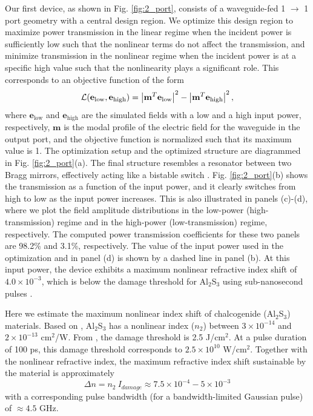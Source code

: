 Our first device, as shown in Fig. \ref{fig:2_port}, consists of a waveguide-fed 1 $\to$ 1 port geometry with a central design region.  We optimize this design region to maximize power transmission in the linear regime when the incident power is sufficiently low such that the nonlinear terms do not affect the transmission, and minimize transmission in the nonlinear regime when the incident power is at a specific high value such that the nonlinearity plays a significant role.  This corresponds to an objective function of the form
%
\begin{equation}
    \mathcal{L}(\mathbf{e}_{\textrm{low}}, \mathbf{e}_{\textrm{high}}) = \left|\mathbf{m}^T \mathbf{e}_{\textrm{low}}\right|^2 - \left|\mathbf{m}^T \mathbf{e}_{\textrm{high}}\right|^2,
\end{equation}
%
where $\mathbf{e}_{\mathrm{low}}$ and $\mathbf{e}_{\mathrm{high}}$ are the simulated fields with a low and a high input power, respectively, $\mathbf{m}$ is the modal profile of the electric field for the waveguide in the output port, and the objective function is normalized such that its maximum value is 1.  The optimization setup and the optimized structure are diagrammed in Fig. \ref{fig:2_port}(a). The final structure resembles a resonator between two Bragg mirrors, effectively acting like a bistable switch \cite{soljacic2002optimal, yanik_all-optical_2003}. Fig. \ref{fig:2_port}(b) shows the transmission as a function of the input power, and it clearly switches from high to low as the input power increases. This is also illustrated in panels (c)-(d), where we plot the field amplitude distributions in the low-power (high-transmission) regime and in the high-power (low-transmission) regime, respectively. The computed power transmission coefficients for these two panels are 98.2\% and 3.1\%, respectively. The value of the input power used in the optimization and in panel (d) is shown by a dashed line in panel (b). At this input power, the device exhibits a maximum nonlinear refractive index shift of $4.0 \times 10^{-3}$, which is below the damage threshold for Al$_2$S$_3$ using sub-nanosecond pulses \cite{chorel2018robust}.

Here we estimate the maximum nonlinear index shift of chalcogenide (Al$_2$S$_3$) materials.  Based on \cite{Boyd__2008, Lamont_OptExpress_2008, White_OptLett_2011}, Al$_2$S$_3$ has a nonlinear index ($n_2$) between $3 \times 10^{-14}$ and $2 \times 10^{-13}$ cm$^2$/W.
From \cite{chorel2018robust}, the damage threshold is 2.5 J/cm$^2$.  At a pulse duration of 100 ps, this damage threshold corresponds to $2.5 \times 10^{10}$ W/cm$^2$.  Together with the nonlinear refractive index, the maximum refractive index shift sustainable by the material is approximately
\begin{equation}
\Delta n = n_2~I_{damage} \approx 7.5\times10^{-4} - 5\times10^{-3}
\end{equation}
with a corresponding pulse bandwidth (for a bandwidth-limited Gaussian pulse) of $\approx 4.5$ GHz.  



